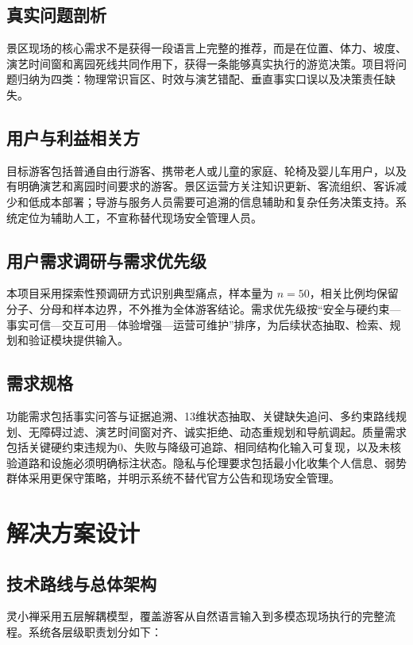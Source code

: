\documentclass[11pt,a4paper]{ctexart}
\begin{document}
\subsection{真实问题剖析}
景区现场的核心需求不是获得一段语言上完整的推荐，而是在位置、体力、坡度、演艺时间窗和离园死线共同作用下，获得一条能够真实执行的游览决策。项目将问题归纳为四类：物理常识盲区、时效与演艺错配、垂直事实口误以及决策责任缺失。

\subsection{用户与利益相关方}
目标游客包括普通自由行游客、携带老人或儿童的家庭、轮椅及婴儿车用户，以及有明确演艺和离园时间要求的游客。景区运营方关注知识更新、客流组织、客诉减少和低成本部署；导游与服务人员需要可追溯的信息辅助和复杂任务决策支持。系统定位为辅助人工，不宣称替代现场安全管理人员。

\subsection{用户需求调研与需求优先级}
本项目采用探索性预调研方式识别典型痛点，样本量为 $n=50$，相关比例均保留分子、分母和样本边界，不外推为全体游客结论。需求优先级按“安全与硬约束—事实可信—交互可用—体验增强—运营可维护”排序，为后续状态抽取、检索、规划和验证模块提供输入。

\subsection{需求规格}
功能需求包括事实问答与证据追溯、13维状态抽取、关键缺失追问、多约束路线规划、无障碍过滤、演艺时间窗对齐、诚实拒绝、动态重规划和导航调起。质量需求包括关键硬约束违规为0、失败与降级可追踪、相同结构化输入可复现，以及未核验道路和设施必须明确标注状态。隐私与伦理要求包括最小化收集个人信息、弱势群体采用更保守策略，并明示系统不替代官方公告和现场安全管理。

\section{解决方案设计}

\subsection{技术路线与总体架构}
灵小禅采用五层解耦模型，覆盖游客从自然语言输入到多模态现场执行的完整流程。系统各层级职责划分如下：
\end{document}
